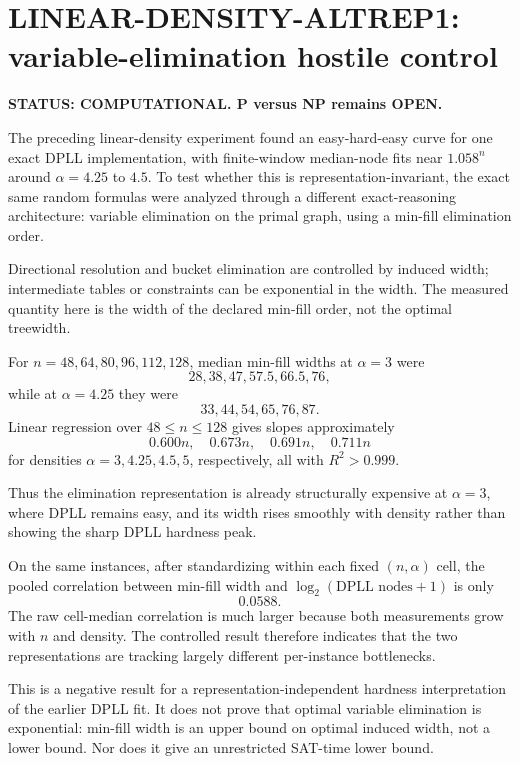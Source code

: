\section*{LINEAR-DENSITY-ALTREP1: variable-elimination hostile control}

\textbf{STATUS: COMPUTATIONAL. P versus NP remains OPEN.}

The preceding linear-density experiment found an easy-hard-easy curve for one exact DPLL
implementation, with finite-window median-node fits near \(1.058^n\) around
\(\alpha=4.25\) to \(4.5\). To test whether this is representation-invariant, the exact
same random formulas were analyzed through a different exact-reasoning architecture:
variable elimination on the primal graph, using a min-fill elimination order.

Directional resolution and bucket elimination are controlled by induced width; intermediate
tables or constraints can be exponential in the width. The measured quantity here is the
width of the declared min-fill order, not the optimal treewidth.

For \(n=48,64,80,96,112,128\), median min-fill widths at \(\alpha=3\) were
\[
28,38,47,57.5,66.5,76,
\]
while at \(\alpha=4.25\) they were
\[
33,44,54,65,76,87.
\]
Linear regression over \(48\le n\le128\) gives slopes approximately
\[
0.600n,\quad0.673n,\quad0.691n,\quad0.711n
\]
for densities \(\alpha=3,4.25,4.5,5\), respectively, all with \(R^2>0.999\).

Thus the elimination representation is already structurally expensive at \(\alpha=3\),
where DPLL remains easy, and its width rises smoothly with density rather than showing the
sharp DPLL hardness peak.

On the same instances, after standardizing within each fixed \((n,\alpha)\) cell, the pooled
correlation between min-fill width and \(\log_2(\text{DPLL nodes}+1)\) is only
\[
\boxed{0.0588}.
\]
The raw cell-median correlation is much larger because both measurements grow with \(n\)
and density. The controlled result therefore indicates that the two representations are
tracking largely different per-instance bottlenecks.

This is a negative result for a representation-independent hardness interpretation of the
earlier DPLL fit. It does not prove that optimal variable elimination is exponential:
min-fill width is an upper bound on optimal induced width, not a lower bound. Nor does it
give an unrestricted SAT-time lower bound.

